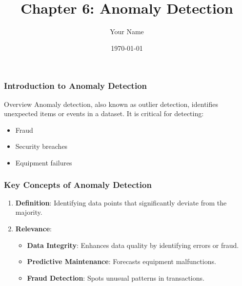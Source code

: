 \documentclass{beamer}
\title{Chapter 6: Anomaly Detection}
\author{Your Name}
\institute{Your Institution}
\date{\today}
\begin{document}
\frame{\titlepage}

\begin{frame}[fragile]
    \frametitle{Introduction to Anomaly Detection}
    \begin{block}{Overview}
        Anomaly detection, also known as outlier detection, identifies unexpected items or events in a dataset. 
        It is critical for detecting:
        \begin{itemize}
            \item Fraud
            \item Security breaches
            \item Equipment failures
        \end{itemize}
    \end{block}
\end{frame}

\begin{frame}[fragile]
    \frametitle{Key Concepts of Anomaly Detection}
    \begin{enumerate}
        \item \textbf{Definition}: Identifying data points that significantly deviate from the majority. 
        \item \textbf{Relevance}:
        \begin{itemize}
            \item \textbf{Data Integrity}: Enhances data quality by identifying errors or fraud.
            \item \textbf{Predictive Maintenance}: Forecasts equipment malfunctions.
            \item \textbf{Fraud Detection}: Spots unusual patterns in transactions.
        \end{itemize}
    \end{enumerate}
\end{frame}
\end{document}

